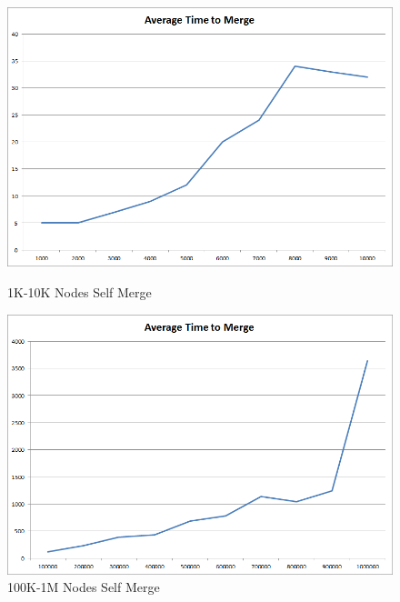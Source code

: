 \begin{figure}[ht]
\begin{minipage}[b]{0.45\linewidth}
\centering
\includegraphics[width=\textwidth]{media/chapter5/perf/selfmerge_10K.png}
\caption{1K-10K Nodes Self Merge}
\label{fig:1k-self-merge}
\end{minipage}
\hspace{0.5cm}
\begin{minipage}[b]{0.45\linewidth}
\centering
\includegraphics[width=\textwidth]{media/chapter5/perf/selfmerge_1M.png}
\caption{100K-1M Nodes Self Merge}
\label{fig:1m-self-merge}
\end{minipage}
\end{figure}

